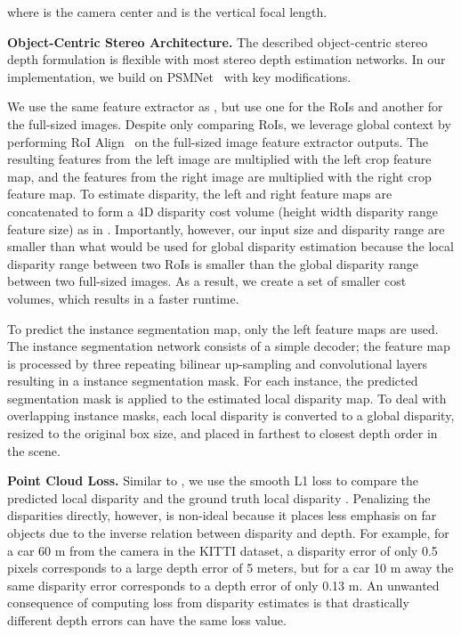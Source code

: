 \documentclass[letterpaper, 10 pt, conference]{ieeeconf}
\begin{document}
where  is the camera center and  is the vertical focal length.

\textbf{Object-Centric Stereo Architecture.} The described object-centric stereo depth formulation is flexible with most stereo depth estimation networks. In our implementation, we build on PSMNet~\cite{chang2018psmnet} with key modifications.

We use the same feature extractor as \cite{chang2018psmnet}, but use one for the RoIs and another for the full-sized images. Despite only comparing RoIs, we leverage global context by performing RoI Align~\cite{he2017mask} on the full-sized image feature extractor outputs. The resulting features from the left image are multiplied with the left crop feature map, and the features from the right image are multiplied with the right crop feature map. To estimate disparity, the left and right feature maps are concatenated to form a 4D disparity cost volume (height  width  disparity range  feature size) as in \cite{chang2018psmnet}. Importantly, however, our input size and disparity range are smaller than what would be used for global disparity estimation because the local disparity range between two RoIs is smaller than the global disparity range between two full-sized images. As a result, we create a set of smaller cost volumes, which results in a faster runtime.

To predict the instance segmentation map, only the left feature maps are used. The instance segmentation network consists of a simple decoder; the feature map is processed by three repeating bilinear up-sampling and  convolutional layers resulting in a  instance segmentation mask. For each instance, the predicted segmentation mask is applied to the estimated local disparity map. To deal with overlapping instance masks, each local disparity is converted to a global disparity, resized to the original box size, and placed in farthest to closest depth order in the scene.

\textbf{Point Cloud Loss.} Similar to \cite{chang2018psmnet}, we use the smooth L1 loss to compare the predicted local disparity  and the ground truth local disparity . Penalizing the disparities directly, however, is non-ideal because it places less emphasis on far objects due to the inverse relation between disparity and depth. For example, for a car 60 m from the camera in the KITTI dataset, a disparity error of only 0.5 pixels corresponds to a large depth error of 5 meters, but for a car 10 m away the same disparity error corresponds to a depth error of only 0.13 m. An unwanted consequence of computing loss from disparity estimates is that drastically different depth errors can have the same loss value.
\end{document}
